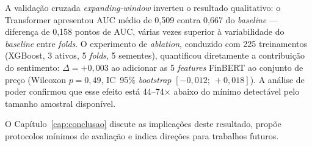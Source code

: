 A validação cruzada \textit{expanding-window} inverteu o resultado qualitativo: o Transformer apresentou AUC médio de 0,509 contra 0,667 do \textit{baseline} --- diferença de 0,158 pontos de AUC, várias vezes superior à variabilidade do \textit{baseline} entre \textit{folds}. O experimento de \textit{ablation}, conduzido com 225 treinamentos (XGBoost, 3 ativos, 5 \textit{folds}, 5 sementes), quantificou diretamente a contribuição do sentimento: $\Delta = +0{,}003$ ao adicionar as 5 \textit{features} FinBERT ao conjunto de preço (Wilcoxon $p = 0{,}49$, IC~95\% \textit{bootstrap} $[-0{,}012;\ +0{,}018]$). A análise de poder confirmou que esse efeito está 44--74$\times$ abaixo do mínimo detectável pelo tamanho amostral disponível.

O Capítulo~\ref{cap:conclusao} discute as implicações deste resultado, propõe protocolos mínimos de avaliação e indica direções para trabalhos futuros.


